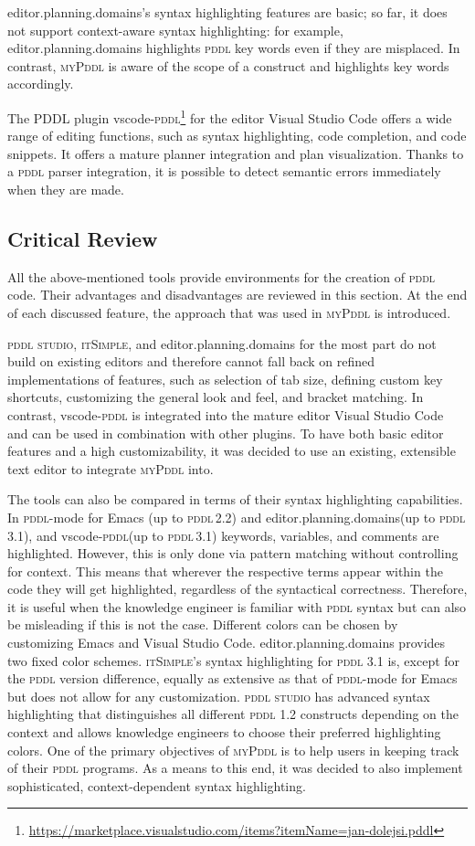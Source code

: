 \documentclass[runningheads]{llncs}
\newcommand{\mypddl}{\textsc{myPddl}\xspace}
\newcommand{\pddlstudio}{\textsc{pddl studio}\xspace}
\newcommand{\epd}{editor.planning.domains\xspace}
\newcommand{\itsimple}{\textsc{itSimple}\xspace}
\newcommand{\pddlmode}{\textsc{pddl}-mode\xspace}
\newcommand{\pddl}{\textsc{pddl}\xspace}
\begin{document}
\epd's syntax highlighting features are basic; so far, it does not
support context-aware syntax highlighting: for example,
editor.planning.domains highlights \pddl key words even if they are
misplaced. In contrast, \mypddl is aware of the scope of a construct
and highlights key words accordingly.

The PDDL plugin
vscode-\pddl\footnote{\url{https://marketplace.visualstudio.com/items?itemName=jan-dolejsi.pddl}}
for the editor Visual Studio Code offers a wide range of editing
functions, such as syntax highlighting, code completion, and code
snippets. It offers a mature planner integration and plan
visualization. Thanks to a \pddl parser integration, it is possible to
detect semantic errors immediately when they are made.

\subsection{Critical Review}
\label{sec-3-4}

All the above-mentioned tools provide environments for the creation of
\pddl code. Their advantages and disadvantages are reviewed in this
section. At the end of each discussed feature, the approach that was
used in \mypddl is introduced.

\pddlstudio, \itsimple, and \epd for the most part do not build on
existing editors and therefore cannot fall back on refined
implementations of features, such as selection of tab size, defining
custom key shortcuts, customizing the general look and feel, and
bracket matching. In contrast, vscode-\pddl is integrated into the
mature editor Visual Studio Code and can be used in combination with
other plugins. To have both basic editor features and a high
customizability, it was decided to use an existing, extensible text
editor to integrate \mypddl into.

The tools can also be compared in terms of their syntax highlighting
capabilities. In \pddlmode for Emacs (up to \pddl\,2.2) and \epd (up
to \pddl\,3.1), and vscode-\pddl (up to \pddl\,3.1) keywords,
variables, and comments are highlighted. However, this is only done
via pattern matching without controlling for context. This means that
wherever the respective terms appear within the code they will get
highlighted, regardless of the syntactical correctness. Therefore, it
is useful when the knowledge engineer is familiar with \pddl syntax
but can also be misleading if this is not the case. Different colors
can be chosen by customizing Emacs and Visual Studio Code. \epd
provides two fixed color schemes. \itsimple's syntax highlighting for
\pddl 3.1 is, except for the \pddl version difference, equally as
extensive as that of \pddlmode for Emacs but does not allow for any
customization.  \pddlstudio has advanced syntax highlighting that
distinguishes all different \pddl 1.2 constructs depending on the
context and allows knowledge engineers to choose their preferred
highlighting colors. One of the primary objectives of \mypddl is to
help users in keeping track of their \pddl programs. As a means to
this end, it was decided to also implement sophisticated,
context-dependent syntax highlighting.
\end{document}
